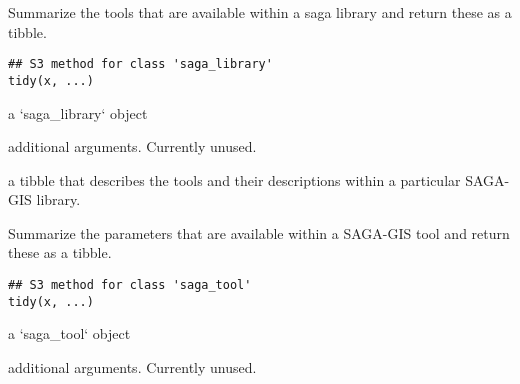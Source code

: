 \documentclass[a4paper]{book}
\begin{document}
%
\begin{Description}
Summarize the tools that are available within a saga library and
return these as a tibble.
\end{Description}
%
\begin{Usage}
\begin{verbatim}
## S3 method for class 'saga_library'
tidy(x, ...)
\end{verbatim}
\end{Usage}
%
\begin{Arguments}
\begin{ldescription}
\item[\code{x}] a `saga\_library` object

\item[\code{...}] additional arguments. Currently unused.
\end{ldescription}
\end{Arguments}
%
\begin{Value}
a tibble that describes the tools and their descriptions within a
particular SAGA-GIS library.
\end{Value}
%
\begin{Examples}
\end{Examples}
%
\begin{Description}
Summarize the parameters that are available within a SAGA-GIS tool and
return these as a tibble.
\end{Description}
%
\begin{Usage}
\begin{verbatim}
## S3 method for class 'saga_tool'
tidy(x, ...)
\end{verbatim}
\end{Usage}
%
\begin{Arguments}
\begin{ldescription}
\item[\code{x}] a `saga\_tool` object

\item[\code{...}] additional arguments. Currently unused.
\end{ldescription}
\end{Arguments}
\end{document}
